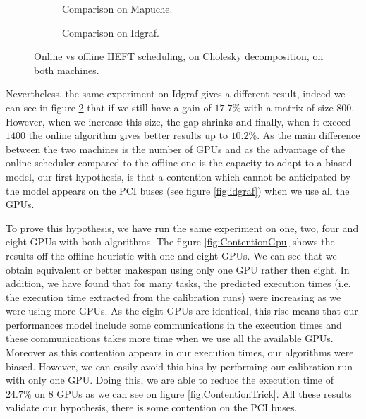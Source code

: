 \documentclass[10pt, conference, compsocconf,pdftex,dvipsnames]{IEEEtran}
\begin{document}
\begin{figure}[h!]
    \centering
    \begin{subfigure}{0.5\textwidth}
        \scalebox{0.65}{
            
        }
        \caption{Comparison on Mapuche.}
        \label{fig:OnOffMapuche}
    \end{subfigure}
    \begin{subfigure}{0.5\textwidth}
        \scalebox{0.65}{
            
        }
        \caption{Comparison on Idgraf.}
        \label{fig:OnOffIdgraf}
    \end{subfigure}
    \caption{Online vs offline HEFT scheduling, on Cholesky decomposition, on both
    machines.}
    \label{fig:OnOff}
\end{figure}

Nevertheless, the same experiment on Idgraf gives a different result, indeed
we can see in figure \ref{fig:OnOffIdgraf} that if we still have a gain of
$17.7\%$ with a matrix of size $800$. However, when we increase this size, the
gap shrinks and finally, when it exceed $1400$ the online algorithm gives
better results up to $10.2\%$. As the main difference between the two machines
is the number of GPUs and as the advantage of the online scheduler compared to
the offline one is the capacity to adapt to a biased model, our first
hypothesis, is that a contention which cannot be anticipated by the model
appears on the PCI buses (see figure \ref{fig:idgraf}) when we use all the
GPUs. 

To prove this hypothesis, we have run the same experiment on one, two, four
and eight GPUs with both algorithms. The figure \ref{fig:ContentionGpu} shows
the results off the offline heuristic with one and eight GPUs. We can see that
we obtain equivalent or better makespan using only one GPU rather then eight.
In addition, we have found that for many tasks, the predicted execution times
(i.e. the execution time extracted from the calibration runs) were increasing
as we were using more GPUs. As the eight GPUs are identical, this rise means
that our performances model include some communications in the execution times
and these communications takes more time when we use all the available GPUs.
Moreover as this contention appears in our execution times, our algorithms
were biased. However, we can easily avoid this bias by performing our
calibration run with only one GPU. Doing this, we are able to reduce the
execution time of $24.7\%$ on 8 GPUs as we can see on figure
\ref{fig:ContentionTrick}. All these results validate our hypothesis, there is
some contention on the PCI buses.
\end{document}
